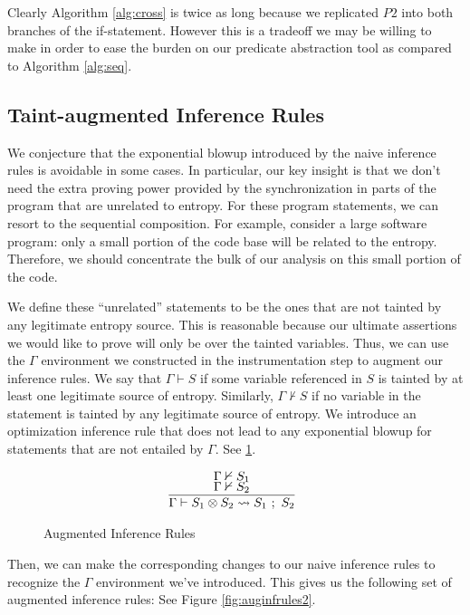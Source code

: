 \documentclass[letterpaper,twocolumn,10pt]{article}
\newcommand{\cross}{\otimes{}}
\begin{document}
Clearly Algorithm \ref{alg:cross} is twice as long because we replicated $P2$ into both branches of the if-statement. However this is a tradeoff we may be willing to make in order to ease the burden on our predicate abstraction tool as compared to Algorithm \ref{alg:seq}.

\subsection{Taint-augmented Inference Rules}

We conjecture that the exponential blowup introduced by the naive inference rules is avoidable in some cases. In particular, our key insight is that we don't need the extra proving power provided by the synchronization in parts of the program that are unrelated to entropy. For these program statements, we can resort to the sequential composition. For example, consider a large software program: only a small portion of the code base will be related to the entropy. Therefore, we should concentrate the bulk of our analysis on this small portion of the code. 

We define these ``unrelated'' statements to be the ones that are not tainted by any legitimate entropy source. This is reasonable because our ultimate assertions we would like to prove will only be over the tainted variables. Thus, we can use the $\Gamma$ environment we constructed in the instrumentation step to augment our inference rules. We say that $\Gamma \vdash S$ if some variable referenced in $S$ is tainted by at least one legitimate source of entropy. Similarly, $\Gamma \nvdash S$ if no variable in the statement is tainted by any legitimate source of entropy. We introduce an optimization inference rule that does not lead to any exponential blowup for statements that are not entailed by $\Gamma$. See \ref{fig:auginfrules1}.

\begin{figure}
    \caption{Augmented Inference Rules}
    \label{fig:auginfrules1}
    \[
		\begin{array}{c}
			\infer[]{\Gamma \vdash S_1 \cross S_2 \leadsto S_1\ ;\ S_2}{
				\Gamma \nvdash S_1 \\
				\Gamma \nvdash S_2
			} \\
		\end{array}
    \]
\end{figure}

Then, we can make the corresponding changes to our naive inference rules to recognize the $\Gamma$ environment we've introduced. This gives us the following set of augmented inference rules: See Figure \ref{fig:auginfrules2}.
\end{document}
